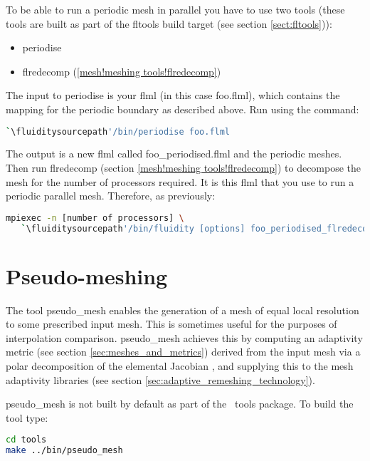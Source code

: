 To be able to run a periodic mesh in parallel you have to use two tools (these tools are built as part of the fltools build target (see section \ref{sect:fltools})):

\begin{itemize}
\item periodise
\item flredecomp (\ref{mesh!meshing tools!flredecomp})
\end{itemize}

The input to periodise is your flml (in this case foo.flml), which contains the mapping for the periodic boundary as described above. Run using the command:

\begin{lstlisting}[language=bash]
`\fluiditysourcepath'/bin/periodise foo.flml
\end{lstlisting}

The output is a new flml called  foo\_periodised.flml and the periodic meshes. Then run flredecomp (section \ref{mesh!meshing tools!flredecomp}) to decompose the mesh for the number of processors required. It is this flml that you use to run a periodic parallel mesh. Therefore, as previously:

\begin{lstlisting}[language=bash]
mpiexec -n [number of processors] \
   `\fluiditysourcepath'/bin/fluidity [options] foo_periodised_flredecomp.flml
\end{lstlisting}

\section{Pseudo-meshing}

The tool pseudo\_mesh enables the generation of a mesh of equal local resolution
to some prescribed input mesh. This is sometimes useful for the purposes of
interpolation comparison. pseudo\_mesh achieves this by computing an adaptivity
metric (see section \ref{sec:meshes_and_metrics}) derived from the input mesh
via a polar decomposition of the
elemental Jacobian \citep{micheletti2006}, and supplying this to the mesh adaptivity libraries
(see section \ref{sec:adaptive_remeshing_technology}).

pseudo\_mesh is not built by default as part of the \fluidity\ tools package. To
build the tool type:

\begin{lstlisting}[language = Bash]
cd tools
make ../bin/pseudo_mesh
\end{lstlisting}

